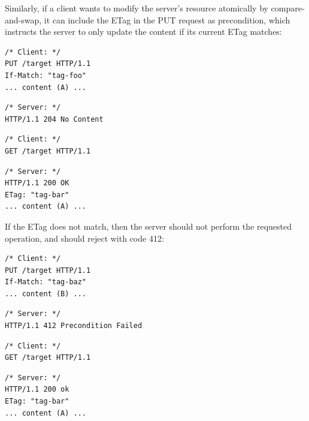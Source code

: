 Similarly, if a client wants to modify the server's resource atomically by
compare-and-swap, it can include the ETag in the PUT request as
 precondition, which instructs the server to only update the
content if its current ETag matches:
\begin{center}
  \begin{minipage}[t]{.4\textwidth}
    \begin{lstlisting}[style=customc]
/* Client: */
PUT /target HTTP/1.1
If-Match: "tag-foo"
... content (A) ...
    \end{lstlisting}
  \end{minipage}
  \begin{minipage}[t]{.4\textwidth}
    \begin{lstlisting}[style=customc]
/* Server: */
HTTP/1.1 204 No Content
    \end{lstlisting}
  \end{minipage}

  \begin{minipage}[t]{.4\textwidth}
    \begin{lstlisting}[style=customc]
/* Client: */
GET /target HTTP/1.1
    \end{lstlisting}
  \end{minipage}
  \begin{minipage}[t]{.4\textwidth}
    \begin{lstlisting}[style=customc]
/* Server: */
HTTP/1.1 200 OK
ETag: "tag-bar"
... content (A) ...
    \end{lstlisting}
  \end{minipage}
\end{center}
If the ETag does not match, then the server should not perform the requested
operation, and should reject with code 412:
\begin{center}
  \begin{minipage}[t]{.4\textwidth}
    \begin{lstlisting}[style=customc]
/* Client: */
PUT /target HTTP/1.1
If-Match: "tag-baz"
... content (B) ...
    \end{lstlisting}
  \end{minipage}
  \begin{minipage}[t]{.4\textwidth}
    \begin{lstlisting}[style=customc]
/* Server: */
HTTP/1.1 412 Precondition Failed
    \end{lstlisting}
  \end{minipage}

  \begin{minipage}[t]{.4\textwidth}
    \begin{lstlisting}[style=customc]
/* Client: */
GET /target HTTP/1.1
    \end{lstlisting}
  \end{minipage}
  \begin{minipage}[t]{.4\textwidth}
    \begin{lstlisting}[style=customc]
/* Server: */
HTTP/1.1 200 ok
ETag: "tag-bar"
... content (A) ...
    \end{lstlisting}
  \end{minipage}
\end{center}
